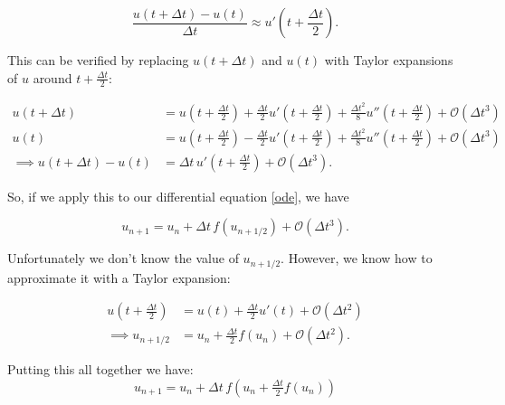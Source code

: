 \documentclass{article}
\newcommand{\dt}{\Delta t}
\newcommand{\bigO}{\mathcal{O}}
\newcommand{\uni}{u_{n+1}}
\newcommand{\unhalf}{u_{n+1/2}}
\begin{document}
\begin{equation}
    \frac{u(t+\dt) - u(t)}{\dt} \approx u'(t+\frac{\dt}{2}).
\end{equation}

This can be verified by replacing $u(t+\dt)$ and $u(t)$ with Taylor expansions of $u$ around $t+\frac{\dt}{2}$:

\begin{align*}
    u(t+\dt) &= u(t+\frac{\dt}{2}) + \frac{\dt}{2} u'(t+\frac{\dt}{2}) + \frac{\dt^2}{8} u''(t+\frac{\dt}{2}) + 
    \bigO(\dt^3) \\
    u(t) &= u(t+\frac{\dt}{2}) - \frac{\dt}{2} u'(t+\frac{\dt}{2}) + \frac{\dt^2}{8} u''(t+\frac{\dt}{2}) + 
    \bigO(\dt^3) \\
    \implies u(t+\dt) - u(t) &= \dt\, u'(t+\frac{\dt}{2}) + \bigO(\dt^3).
\end{align*}

So, if we apply this to our differential equation \eqref{ode}, we have

\begin{equation}
    \uni = u_n + \dt\, f(\unhalf) + \bigO(\dt^3).
    \label{mid-error}
\end{equation}

Unfortunately we don't know the value of $\unhalf$. 
However, we know how to approximate it with a Taylor expansion:

\begin{equation}
    \begin{split}
        u(t+\frac{\dt}{2}) &= u(t) + \frac{\dt}{2} u'(t) + \bigO(\dt^2) \\
        \implies \unhalf &= u_n + \frac{\dt}{2} f(u_n) + \bigO(\dt^2).
    \end{split}
    \label{mid-insides}
\end{equation}

Putting this all together we have:
\begin{equation}
    \boxed{\uni = u_n + \dt\, f\left(u_n + \tfrac{\dt}{2} f(u_n)\right)}
    \tag{Midpoint method}
\end{equation}
\end{document}
